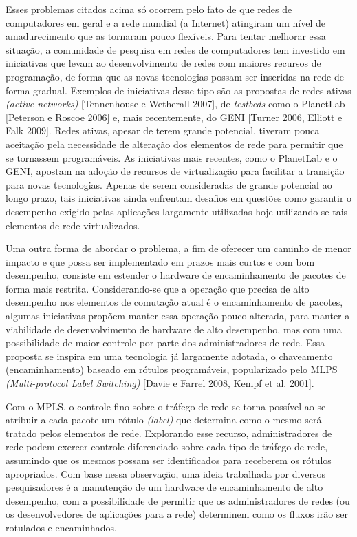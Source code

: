 Esses problemas citados acima só ocorrem pelo fato de que redes
de computadores em geral e a rede mundial (a Internet)
atingiram um nível de amadurecimento que as tornaram pouco 
flexíveis.
Para tentar melhorar essa situação, a comunidade de pesquisa
em redes de computadores tem investido em iniciativas que
levam ao desenvolvimento de redes com maiores 
recursos de programação, de forma que as novas tecnologias
possam ser inseridas na rede de forma gradual. Exemplos de
iniciativas desse tipo são as propostas de redes ativas
\textit{(active networks)} [Tennenhouse e Wetherall 2007],
de \textit{testbeds} como o PlanetLab [Peterson e Roscoe 2006]
e, mais recentemente, do GENI [Turner 2006, Elliott e Falk
2009]. Redes ativas, apesar de terem grande potencial,
tiveram pouca aceitação pela necessidade de alteração dos
elementos de rede para permitir que se tornassem programáveis. As iniciativas 
mais recentes, como o PlanetLab e o GENI, apostam na adoção
de recursos de virtualização para facilitar a transição para
novas tecnologias. Apenas de serem consideradas de
grande potencial ao longo prazo, tais iniciativas ainda
enfrentam desafios em questões como garantir o desempenho
exigido pelas aplicações largamente utilizadas hoje
utilizando-se tais elementos de rede virtualizados.

Uma outra forma de abordar o problema, a fim de oferecer
um caminho de menor impacto e que possa ser implementado 
em prazos mais curtos e com bom desempenho, consiste
em estender o hardware de encaminhamento de pacotes
de forma mais restrita. Considerando-se que a operação 
que precisa de alto desempenho nos elementos de comutação
atual é o encaminhamento de pacotes, algumas iniciativas
propõem manter essa operação pouco alterada, para manter 
a viabilidade de desenvolvimento de hardware de alto
desempenho, mas com uma possibilidade de maior controle 
por parte dos administradores de rede. Essa proposta se inspira 
em uma tecnologia já largamente adotada, o chaveamento
(encaminhamento) baseado em rótulos programáveis, 
popularizado pelo MLPS \textit{(Multi-protocol Label
 Switching)} [Davie e Farrel 2008, Kempf et al. 2001].

Com o MPLS, o controle fino sobre o tráfego de rede se torna 
possível ao se atribuir a cada pacote um rótulo \textit{(label)}
que determina como o mesmo será tratado pelos elementos
de rede. Explorando esse recurso, administradores de rede podem
exercer controle diferenciado sobre cada tipo de tráfego de rede,
assumindo que os mesmos possam ser identificados para
receberem os rótulos apropriados. Com base nessa observação,
uma ideia trabalhada por diversos pesquisadores é a manutenção 
de um hardware de encaminhamento de alto desempenho, com
a possibilidade de permitir que os administradores de redes (ou 
os desenvolvedores de aplicações para a rede) determinem como 
os fluxos irão ser rotulados e encaminhados.

